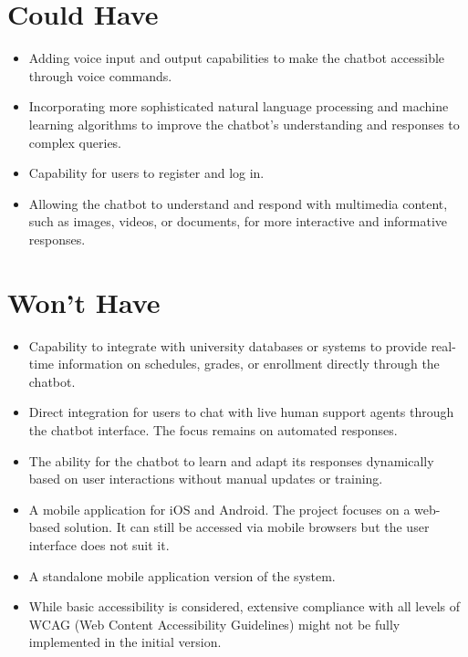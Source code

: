 \documentclass{l4proj}
\begin{document}
\section*{\textbf{Could Have}}

\begin{itemize}
    \item Adding voice input and output capabilities to make the chatbot accessible through voice commands.

    \item  Incorporating more sophisticated natural language processing and machine learning algorithms to improve the chatbot's understanding and responses to complex queries.

    \item Capability for users to register and log in.

    \item Allowing the chatbot to understand and respond with multimedia content, such as images, videos, or documents, for more interactive and informative responses.

\end{itemize}

\section*{\textbf{Won't Have}}

\begin{itemize}

    \item  Capability to integrate with university databases or systems to provide real-time information on schedules, grades, or enrollment directly through the chatbot.

    \item Direct integration for users to chat with live human support agents through the chatbot interface. The focus remains on automated responses.

    \item The ability for the chatbot to learn and adapt its responses dynamically based on user interactions without manual updates or training.

    \item A mobile application for iOS and Android. The project focuses on a web-based solution. It can still be accessed via mobile browsers but the user interface does not suit it.

    \item A standalone mobile application version of the system.

    \item While basic accessibility is considered, extensive compliance with all levels of WCAG (Web Content Accessibility Guidelines) might not be fully implemented in the initial version.
    
\end{itemize}
\end{document}
